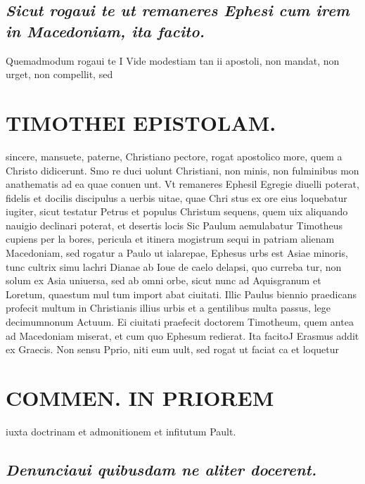 \documentclass{article}
\begin{document}
\begin{pages}
\subsection*{\textit{Sicut rogaui te ut remaneres Ephesi cum irem in Macedoniam, ita facito. }}\pstart Quemadmodum rogaui te I Vide modestiam tan ii apostoli, non mandat, non urget, non compellit, sed  \pend
\section*{TIMOTHEI EPISTOLAM. }
\marginpar{[ p.11 ]}\pstart sincere, mansuete, paterne, Christiano pectore, rogat apostolico more, quem a Christo didicerunt. Smo re duci uolunt Christiani, non minis, non fulminibus mon anathematis ad ea quae conuen unt.  \pend\pstart Vt remaneres Ephesil Egregie diuelli poterat, fidelis et docilis discipulus a uerbis uitae, quae Chri stus ex ore eius loquebatur iugiter, sicut testatur Petrus et populus Christum sequens, quem uix aliquando nauigio declinari poterat, et desertis locis Sic Paulum aemulabatur Timotheus cupiens per la bores, pericula et itinera mogistrum sequi in patriam alienam Macedoniam, sed rogatur a Paulo ut  \pend\pstart ialarepae, Ephesus urbs est Asiae minoris, tunc cultrix simu lachri Dianae ab Ioue de caelo delapsi, quo curreba tur, non solum ex Asia uniuersa, sed ab omni orbe, sicut nunc ad Aquisgranum et Loretum, quaestum mul tum import abat ciuitati. Illic Paulus biennio praedicans profecit multum in Christianis illius urbis et a gentilibus multa passus, lege decimumnonum Actuum. Ei ciuitati praefecit doctorem Timotheum, quem antea ad Macedoniam miserat, et cum quo Ephesum redierat.  \pend\pstart Ita facitoJ Erasmus addit ex Graecis. Non sensu Pprio, niti eum uult, sed rogat ut faciat ca et loquetur  \pend
\section*{COMMEN. IN PRIOREM }
\marginpar{[ p.12 ]}\pstart iuxta doctrinam et admonitionem et infitutum Pault.  \pend
{}
{}
\subsection*{\textit{Denunciaui quibusdam ne aliter docerent. }}
{}

\end{pages}
\end{document}
